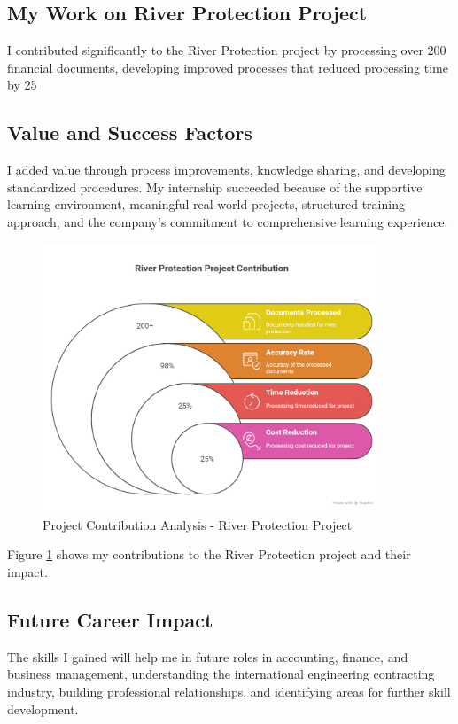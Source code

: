 \subsection{My Work on River Protection Project}
I contributed significantly to the River Protection project by processing over 200 financial documents, developing improved processes that reduced processing time by 25%

\subsection{Value and Success Factors}
I added value through process improvements, knowledge sharing, and developing standardized procedures. My internship succeeded because of the supportive learning environment, meaningful real-world projects, structured training approach, and the company's commitment to comprehensive learning experience.

\begin{figure}[H]
    \centering
    \includegraphics[width=0.9\textwidth]{assets/images/project_contribution_chart.png}
    \caption{Project Contribution Analysis - River Protection Project}
    \label{fig:project_contribution_chart}
\end{figure}

Figure \ref{fig:project_contribution_chart} shows my contributions to the River Protection project and their impact.

\subsection{Future Career Impact}
The skills I gained will help me in future roles in accounting, finance, and business management, understanding the international engineering contracting industry, building professional relationships, and identifying areas for further skill development.
